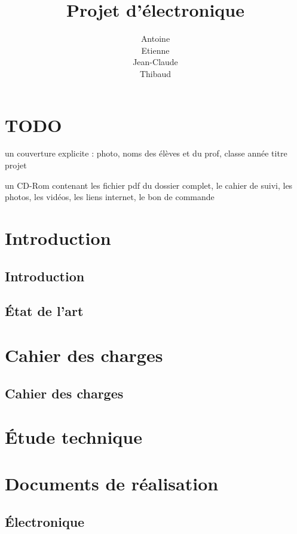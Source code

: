 \documentclass[12pt,titlepage,a4paper]{report}
\title{Projet d'électronique}
\author{Antoine \bsc{Augusti}\\ Etienne \bsc{Batise}\\ Jean-Claude \bsc{Bernard}\\ Thibaud \bsc{Dauce}}
\begin{document}

	\dominitoc
	\tableofcontents

	\setcounter{page}{1}
	\part{TODO}
	un couverture explicite : photo, noms des élèves et du prof, classe année titre projet

	un CD-Rom contenant les fichier pdf du dossier complet, le cahier de suivi, les photos, les vidéos, les liens internet, le bon de commande

	
	\part{Introduction}
        \chapter{Introduction}
	

	\chapter{État de l'art}
	\minitoc
	


	\part{Cahier des charges}
	\chapter{Cahier des charges}
	


	\part{Étude technique}
	


	\part{Documents de réalisation}

	\chapter{Électronique}
	
	
\end{document}
